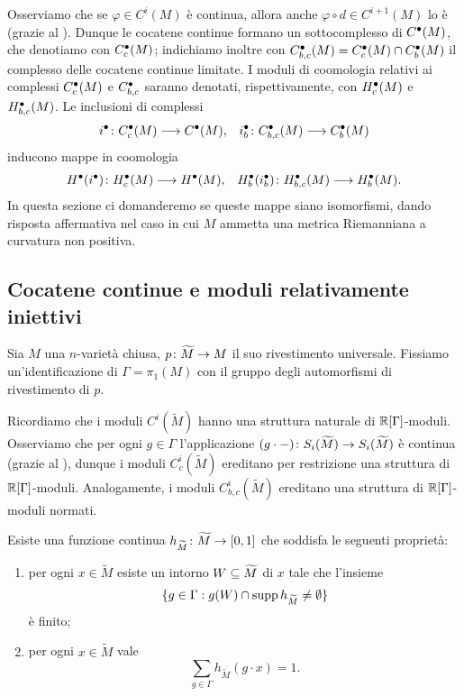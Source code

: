 Osserviamo che se $\varphi\in C^i(M)$ è continua, allora anche $\varphi\circ d\in C^{i+1}(M)$ lo è (grazie al ). Dunque le cocatene continue formano un sottocomplesso di $C^\bullet(M)$, che denotiamo con $C^\bullet_c(M)$; indichiamo inoltre con $C^\bullet_{b,c}(M)=C^\bullet_c(M)\cap C^\bullet_b(M)$ il complesso delle cocatene continue limitate. I moduli di coomologia relativi ai complessi $C^\bullet_c(M)$ e $C^\bullet_{b,c}$ saranno denotati, rispettivamente, con $H^\bullet_c(M)$ e $H^\bullet_{b,c}(M)$. Le inclusioni di complessi
\begin{align*}
\map{i^\bul}{C^\bul_c(M)}{C^\bul(M)},&&\map{i^\bul_b}{C^\bul_{b,c}(M)}{C^\bul_b(M)}
\end{align*}
inducono mappe in coomologia
\begin{align*}
\map{H^\bul(i^\bul)}{H^\bul_c(M)}{H^\bul(M)},&&\map{H^\bul_b(i^\bul_b)}{H^\bul_{b,c}(M)}{H^\bul_b(M)}.
\end{align*}
In questa sezione ci domanderemo se queste mappe siano isomorfismi, dando risposta affermativa nel caso in cui $M$ ammetta una metrica Riemanniana a curvatura non positiva.


\subsection{Cocatene continue e moduli relativamente iniettivi}

Sia $M$ una $n$-varietà chiusa, $\map{p}{\widetilde M}{M}$ il suo rivestimento universale. Fissiamo un'identificazione di $\Gamma=\pi_1(M)$ con il gruppo degli automorfismi di rivestimento di $p$.

Ricordiamo che i moduli $C^i(\widetilde M)$ hanno una struttura naturale di $\mathbb{R}[\Gamma]$-moduli. Osserviamo che per ogni $g\in\Gamma$ l'applicazione $\map{(g\cdot{-})}{S_i(\widetilde M)}{S_i(\widetilde M)}$ è continua (grazie al ), dunque i moduli $C^i_c(\widetilde M)$ ereditano per restrizione una struttura di $\mathbb{R}[\Gamma]$-moduli. Analogamente, i moduli $C^i_{b,c}(\widetilde M)$ ereditano una struttura di $\mathbb{R}[\Gamma]$-moduli normati.

\begin{lemma}
Esiste una funzione continua $\map{h_{\widetilde M}}{\widetilde M}{[0,1]}$ che soddisfa le seguenti proprietà:
\begin{enumerate}
\item per ogni $x\in\widetilde M$ esiste un intorno $W\subseteq \widetilde M$ di $x$ tale che l'insieme
\[
\{g\in\Gamma:g(W)\cap \operatorname{supp} h_{\widetilde M}\neq\emptyset\}
\]
è finito;
\item per ogni $x\in\widetilde M$ vale
\[
\sum_{g\in\Gamma}h_{\widetilde M}(g\cdot x)=1.
\]
\end{enumerate}
\end{lemma}

